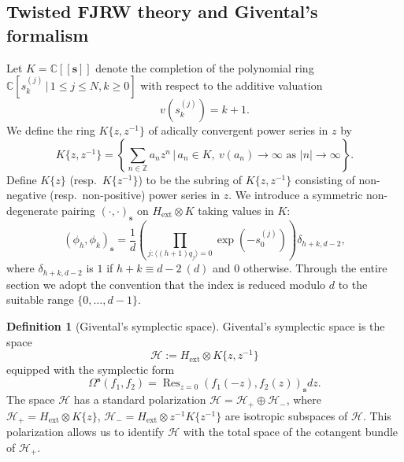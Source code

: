 \documentclass[11pt]{amsart}
\theoremstyle{definition} %
\newtheorem{defn}[thm]{Definition} %
\theoremstyle{remark} %
\newcommand{\CC}{\mathbb C}
\newcommand{\ZZ}{\mathbb Z}
\newcommand{\Res}{\operatorname{Res}}
\newcommand{\tw}{{\rm tw}}
\def\nn{N}
\newcommand{\bs}{\mathbf{s}}
\newcommand{\cH}{\mathcal{H}}
\newcommand{\ext}{{\operatorname{ext}}}
\begin{document}
\subsection{Twisted FJRW theory and Givental's formalism}
\label{subsect:Giventalspace} 
Let $K = \CC[\![\bs]\!]$ denote the completion of the 
polynomial ring 
$\CC[s^{(j)}_k \,|\, 1\le j\le N, k\ge 0]$ 
with respect to the 
additive valuation 
\[
v(s_k^{(j)} ) = k+1. 
\]
We define the ring $K\{z,z^{-1}\}$ of 
adically convergent power series in $z$ by 
\[
K\{z,z^{-1}\} = 
\left\{ \sum_{n\in \ZZ} a_n z^n \,\Big |\, a_n\in K, \ 
v(a_n) \to \infty \text{ as } 
|n| \to \infty \right \}.  
\]
Define $K\{z\}$ (resp.\ $K\{z^{-1}\}$) to be the subring of 
$K\{z,z^{-1}\}$ consisting of non-negative (resp.\ non-positive) 
power series in $z$. 
We introduce a symmetric non-degenerate pairing 
$(\cdot,\cdot)_{\bs}$ 
on $H_\ext\otimes K$ taking values in $K$: 
\begin{equation} 
\label{eq:twisted-pairing}
(\phi_h,\phi_k)_{\bs} = \frac{1}{d} 
\left( \prod_{j : \langle (h+1)q_j  \rangle{{=0}} }
\exp\left(-s^{(j)}_0 \right) \right)\delta_{h+k,d-2},
\end{equation} 
where $\delta_{h+k,d-2}$ is $1$ if $h+k\equiv d-2\ (d)$ and $0$ 
otherwise. 
Through the entire section we adopt the convention 
that the index is reduced 
modulo $d$ to the suitable range $\{0,\dots, d-1\}$. 

\begin{defn}[Givental's symplectic space]
Givental's symplectic space is the space 
\[
\cH := H_\ext \otimes K\{z,z^{-1}\} 
\]
equipped with the symplectic form 
\[
\Omega^{\bs}(f_1,f_2)= 
\Res_{z=0} (f_1(-z),f_2(z))_{\bs} dz. 
\]
The space $\cH$ has a standard polarization  
$\cH = \cH_+ \oplus \cH_-$, 
where $\cH_{+} = H_\ext \otimes K\{z\}$, 
$\cH_- = H_\ext \otimes z^{-1} K \{z^{-1}\}$ 
are isotropic subspaces of $\cH$. 
This polarization allows us to identify 
$\cH$ with the total space of 
the cotangent bundle of $\cH_+$. 
\end{defn}
\end{document}
